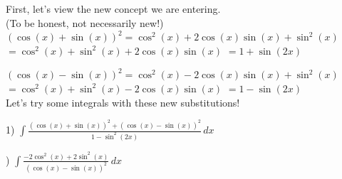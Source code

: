 \documentclass{article}
\begin{document}
First, let's view the new concept we are entering. \\ (To be honest, not necessarily new!)\\

${(\cos(x)+\sin(x))^{2} = \cos^2(x)+2\cos(x)\sin(x)+\sin^2(x)}$ \newline
\indent \indent \indent \indent \indent \indent \indent \indent \space ${= \cos^2(x)+\sin^2(x)+2\cos(x)\sin(x)}$ \newline
\indent \indent \indent \indent \indent \indent \indent \indent \space ${= 1+\sin(2x)}$ \newline

${(\cos(x)-\sin(x))^{2} = \cos^2(x)-2\cos(x)\sin(x)+\sin^2(x)}$ \newline
\indent \indent \indent \indent \indent \indent \indent \indent \space ${= \cos^2(x)+\sin^2(x)-2\cos(x)\sin(x)}$ \newline
\indent \indent \indent \indent \indent \indent \indent \indent \space ${= 1-\sin(2x)}$ \newline
\\
Let's try some integrals with these new substitutions!
\pagebreak

1) ${\displaystyle \int \frac{(\cos(x)+\sin(x))^{2}+(\cos(x)-\sin(x))^{2}}{1-\sin^2(2x)} \,dx}$ \newline

) ${\displaystyle \int \frac{-2\cos^2(x)+2\sin^2(x)}{(\cos(x)-\sin(x))^{2}} \,dx}$ \newline
\end{document}
